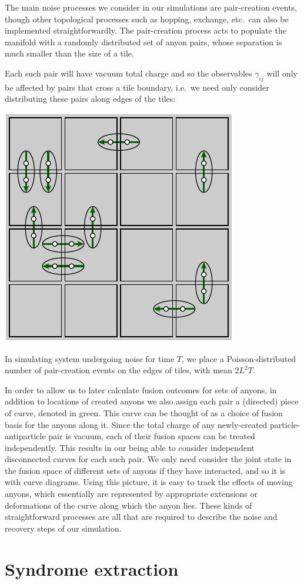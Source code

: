 \documentclass[aps, letterpaper, onecolumn, superscriptaddress, notitlepage, 10pt]{revtex4-1}
\begin{document}
The main noise processes we consider in our simulations are pair-creation events, though other topological processes such as hopping, exchange, etc.~can also be implemented straightforwardly.
The pair-creation process acts to populate the manifold with
a randomly distributed set of anyon pairs,
whose separation is much smaller than the size of a tile.

Each such pair will have vacuum total charge and so the observables
$\gamma_{ij}$ will only be affected by pairs that cross a tile boundary, i.e.~we
need only consider distributing these pairs along edges of the tiles:
\begin{center}
\includegraphics[width=0.3\columnwidth ]{pic-pair-create.pdf}
\end{center}

In simulating system undergoing noise for time $T$, we place a Poisson-distributed number of pair-creation events on the edges of tiles, with mean $2L^2T$.

In order to allow us to later calculate fusion outcomes for sets of anyons, in addition to locations of created anyons we also assign each pair a (directed) piece of curve, denoted in green. This curve can be thought of as a choice of fusion basis for the anyons along it. Since the total charge of any newly-created particle-antiparticle pair is vacuum, each of their fusion spaces can be treated independently. This results in our being able to consider independent disconnected curves for each such pair. We only need consider the joint state in the fusion space of different sets of anyons if they have interacted, and so it is with curve diagrams. Using this picture, it is easy to track the effects of moving anyons, which essentially are represented by appropriate extensions or deformations of the curve along which the anyon lies. These kinds of straightforward processes are all that are required to describe the noise and recovery steps of our simulation.


\section{Syndrome extraction}
\end{document}
